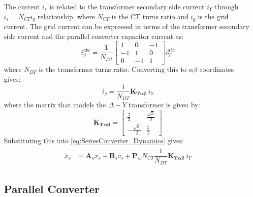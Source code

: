 The current $i_s$ is related to the transformer secondary side current $i_Y$ through $i_s = N_{CT} i_g$ relationship, where $N_{CT}$ is the CT turns ratio and $i_g$ is the grid current. The grid current can be expressed in terms of the transformer secondary side current and the parallel converter capacitor current as:
\begin{equation}
    i_g^{abc} = \dfrac{1}{N_{DT}}
    \begin{bmatrix}
        1 & 0 & -1 \\
        -1 & 1 & 0 \\
        0 & -1 & 1
    \end{bmatrix}
    i_Y^{abc}
\end{equation}
where $N_{DT}$ is the transformer turns ratio. Converting this to $\alpha\beta$ coordinates gives:
\begin{equation}
    i_g = \dfrac{1}{N_{DT}} \mathbf{K_{T\alpha\beta}}\, i_Y
\end{equation}
where the matrix that models the $\Delta-Y$ transformer is given by:
\begin{equation}
    \mathbf{K_{T\alpha\beta}} = 
    \begin{bmatrix} 
        \frac{2}{3} & \frac{\sqrt{3}}{2}\\
        -\frac{\sqrt{3}}{2} & \frac{3}{2} 
    \end{bmatrix}
\end{equation}
Substituting this into \eqref{eq:SeriesConverter_Dynamics} gives:
\begin{align}
    \begin{aligned}
        \dot{x}_s &= \mathbf{A}_s x_s + \mathbf{B}_s v_s + \mathbf{P}_{is} N_{CT} \dfrac{1}{N_{DT}} \mathbf{K_{T\alpha\beta}}\, i_Y
    \end{aligned}
\end{align}

\subsection{Parallel Converter}

